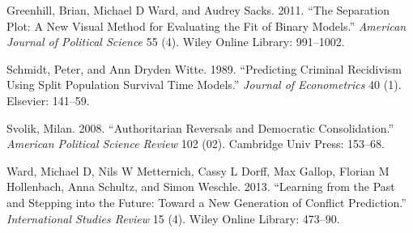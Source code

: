 \documentclass[article]{jss}
\begin{document}
Greenhill, Brian, Michael D Ward, and Audrey Sacks. 2011. ``The
Separation Plot: A New Visual Method for Evaluating the Fit of Binary
Models.'' \emph{American Journal of Political Science} 55 (4). Wiley
Online Library: 991--1002.

Schmidt, Peter, and Ann Dryden Witte. 1989. ``Predicting Criminal
Recidivism Using Split Population Survival Time Models.'' \emph{Journal
of Econometrics} 40 (1). Elsevier: 141--59.

Svolik, Milan. 2008. ``Authoritarian Reversals and Democratic
Consolidation.'' \emph{American Political Science Review} 102 (02).
Cambridge Univ Press: 153--68.

Ward, Michael D, Nils W Metternich, Cassy L Dorff, Max Gallop, Florian M
Hollenbach, Anna Schultz, and Simon Weschle. 2013. ``Learning from the
Past and Stepping into the Future: Toward a New Generation of Conflict
Prediction.'' \emph{International Studies Review} 15 (4). Wiley Online
Library: 473--90.
\end{document}
